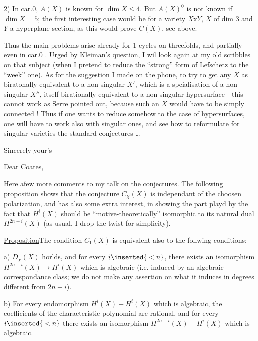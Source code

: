2) In car.0, $A(X)$ is known for $\dim X\leq4$. But $A(X)^0$ is not known if $\dim X=5$; the first interesting case would be for a variety $X\mathrm{x}Y$, $X$ of dim 3 and $Y$ a hyperplane section, as this would prove $C(X)$, see above.

Thus the main problems arise already for 1-cycles on threefolds, and partially even in car.0 . Urged by Kleiman's question, I wil look again at my old scribbles on that subject (when I pretend to reduce the ``strong'' form of Lefschetz to the ``week'' one). As for the suggestion I made on the phone, to try to get any $X$ as biratonally equivalent to a non singular $X'$, which is a spcialisation of a non singular $X''$, itself birationally equivalent to a non singular hypersurface - this cannot work as Serre pointed out, because such an $X$ would have to be simply connected ! Thus if one wants to reduce somehow to the case of hypersurfaces, one will have to work also with singular ones, and see how to reformulate for singular varieties the standard conjectures \ldots

Sincerely your's




Dear Coates,

Here a\inserted{\ }few more comments to my talk on the conjectures. The following proposition shows that the conjecture $C_{\chi}(X)$ is independant of the choosen polarization, and has also some extra interest, in showing the part playd by the fact that $H^i(X)$ should be ``motive-theoretically'' isomorphic to its natural dual $H^{2n-i}(X)$ (as usual, I drop the twist for simplicity).

\uline{Proposition}\quad The condition $C_{1}(X)$ is equivalent also to  the follwing conditions:

a) $D_{\chi}(X)$ horlds, and for every $i\inserted{{}<n}$, there exists an isomorphism $H^{2n-i}(X)\to H^i(X)$ which is algebraic (i.e. induced by an algebraic correspondance class; we do not make any assertion on what it induces in degrees different from $2n-i$).

b) For every endomorphism $H^i(X)\mathbin{-}H^i(X)$ which is algebraic, the coefficients of the characteristic polynomial are rational, and for every $i\inserted{{}<n}$ there exists an isomorphism $H^{2n-i}(X)\mathbin{-}H^i(X)$ which is algebraic.

